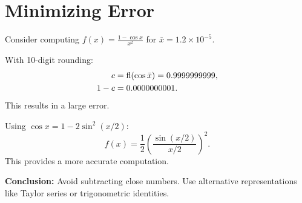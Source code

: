 \section{Minimizing Error}

Consider computing $f(x) = \frac{1 - \cos x}{x^2}$ for $\bar{x} = 1.2 \times 10^{-5}$.

With 10-digit rounding:
\begin{align*}
    c &= \operatorname{fl}(\cos \bar{x}) = 0.9999999999, \\
    1 - c &= 0.0000000001.
\end{align*}
This results in a large error.

Using $\cos x = 1 - 2\sin^2(x/2)$:
\begin{equation*}
    f(x) = \frac{1}{2} \left( \frac{\sin(x/2)}{x/2} \right)^2.
\end{equation*}
This provides a more accurate computation.

\textbf{Conclusion:} Avoid subtracting close numbers. Use alternative 
representations like Taylor series or trigonometric identities.

